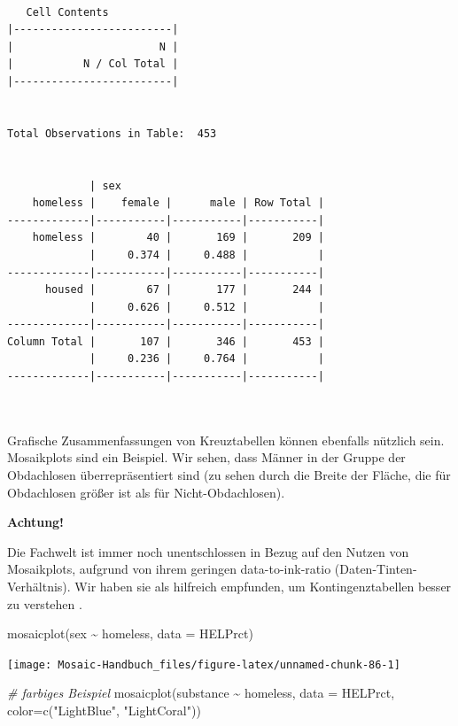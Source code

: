 \documentclass[
  ngerman,
]{scrbook}
\newenvironment{Shaded}{\begin{snugshade}}{\end{snugshade}}
\newcommand{\AttributeTok}[1]{\textcolor[rgb]{0.77,0.63,0.00}{#1}}
\newcommand{\CommentTok}[1]{\textcolor[rgb]{0.56,0.35,0.01}{\textit{#1}}}
\newcommand{\FunctionTok}[1]{\textcolor[rgb]{0.00,0.00,0.00}{#1}}
\newcommand{\NormalTok}[1]{#1}
\newcommand{\SpecialCharTok}[1]{\textcolor[rgb]{0.00,0.00,0.00}{#1}}
\newcommand{\StringTok}[1]{\textcolor[rgb]{0.31,0.60,0.02}{#1}}
\newenvironment{achtung}[1]
  {
  \begin{itemize}
  \renewcommand{\labelitemi}{
    \raisebox{1.8\height}[0pt][0pt]{
      {\setkeys{Gin}{width=7em,keepaspectratio}
        {\Large \textcolor{dark-fom-green}\faExclamationCircle}}
        }
  }
  \begin{blackbox}
        \bgroup\color{dark-fom-green}
          {\textbf{Achtung!}}
        \egroup
  \item
  }
  {
  \end{blackbox}
  \end{itemize}
  }
\begin{document}
\begin{verbatim}
 
   Cell Contents
|-------------------------|
|                       N |
|           N / Col Total |
|-------------------------|

 
Total Observations in Table:  453 

 
             | sex 
    homeless |    female |      male | Row Total | 
-------------|-----------|-----------|-----------|
    homeless |        40 |       169 |       209 | 
             |     0.374 |     0.488 |           | 
-------------|-----------|-----------|-----------|
      housed |        67 |       177 |       244 | 
             |     0.626 |     0.512 |           | 
-------------|-----------|-----------|-----------|
Column Total |       107 |       346 |       453 | 
             |     0.236 |     0.764 |           | 
-------------|-----------|-----------|-----------|

 
\end{verbatim}

Grafische Zusammenfassungen von Kreuztabellen können ebenfalls nützlich sein. Mosaikplots sind ein Beispiel. Wir sehen, dass Männer in der Gruppe der Obdachlosen überrepräsentiert sind (zu sehen durch die Breite der Fläche, die für Obdachlosen größer ist als für Nicht-Obdachlosen).

\begin{achtung}{achtung}
Die Fachwelt ist immer noch unentschlossen in Bezug auf den Nutzen von Mosaikplots, aufgrund von
ihrem geringen data-to-ink-ratio (Daten-Tinten-Verhältnis). Wir haben sie als hilfreich empfunden, um Kontingenztabellen besser zu verstehen \autocite{tufte2001}.

\end{achtung}

\begin{Shaded}
\begin{Highlighting}[]
\FunctionTok{mosaicplot}\NormalTok{(sex }\SpecialCharTok{\textasciitilde{}}\NormalTok{ homeless, }\AttributeTok{data =}\NormalTok{ HELPrct)}
\end{Highlighting}
\end{Shaded}

\begin{center}\texttt{[image: Mosaic-Handbuch\_files/figure-latex/unnamed-chunk-86-1]} \end{center}

\begin{Shaded}
\begin{Highlighting}[]
\CommentTok{\# farbiges Beispiel }
\FunctionTok{mosaicplot}\NormalTok{(substance }\SpecialCharTok{\textasciitilde{}}\NormalTok{ homeless, }\AttributeTok{data =}\NormalTok{ HELPrct,}
           \AttributeTok{color=}\FunctionTok{c}\NormalTok{(}\StringTok{"LightBlue"}\NormalTok{, }\StringTok{"LightCoral"}\NormalTok{)) }
\end{Highlighting}
\end{Shaded}
\end{document}
